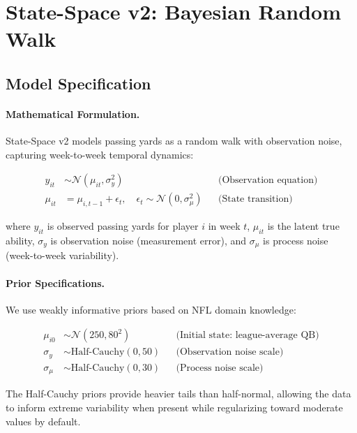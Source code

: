\section{State-Space v2: Bayesian Random Walk}
\label{sec:state-space-v2}

\subsection{Model Specification}

\paragraph{Mathematical Formulation.}
State-Space v2 models passing yards as a random walk with observation noise, capturing week-to-week temporal dynamics:

\begin{align}
\label{eq:state-space-observation}
y_{it} &\sim \mathcal{N}(\mu_{it}, \sigma_y^2) && \text{(Observation equation)} \\
\label{eq:state-space-transition}
\mu_{it} &= \mu_{i,t-1} + \epsilon_t, \quad \epsilon_t \sim \mathcal{N}(0, \sigma_\mu^2) && \text{(State transition)}
\end{align}

\noindent where $y_{it}$ is observed passing yards for player $i$ in week $t$, $\mu_{it}$ is the latent true ability, $\sigma_y$ is observation noise (measurement error), and $\sigma_\mu$ is process noise (week-to-week variability).

\paragraph{Prior Specifications.}
We use weakly informative priors based on NFL domain knowledge:

\begin{align}
\label{eq:state-space-priors}
\mu_{i0} &\sim \mathcal{N}(250, 80^2) && \text{(Initial state: league-average QB)} \\
\sigma_y &\sim \text{Half-Cauchy}(0, 50) && \text{(Observation noise scale)} \\
\sigma_\mu &\sim \text{Half-Cauchy}(0, 30) && \text{(Process noise scale)}
\end{align}

\noindent The Half-Cauchy priors provide heavier tails than half-normal, allowing the data to inform extreme variability when present while regularizing toward moderate values by default.

